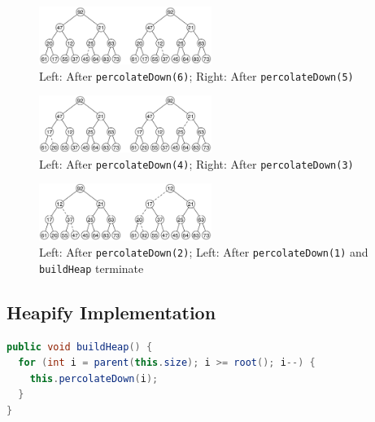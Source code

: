 \documentclass[
  10pt,
  english,
  letterpaper,
,tablecaptionabove
]{scrartcl}
\newcommand{\passthrough}[1]{#1}
\begin{document}
\begin{figure}
\centering
\includegraphics[width=0.5\textwidth,height=\textheight]{images/11.png}
\caption{Left: After \passthrough{\lstinline!percolateDown(6)!}; Right:
After \passthrough{\lstinline!percolateDown(5)!}}
\end{figure}

\begin{figure}
\centering
\includegraphics[width=0.5\textwidth,height=\textheight]{images/12.png}
\caption{Left: After \passthrough{\lstinline!percolateDown(4)!}; Right:
After \passthrough{\lstinline!percolateDown(3)!}}
\end{figure}

\begin{figure}
\centering
\includegraphics[width=0.5\textwidth,height=\textheight]{images/13.png}
\caption{Left: After \passthrough{\lstinline!percolateDown(2)!}; Left:
After \passthrough{\lstinline!percolateDown(1)!} and
\passthrough{\lstinline!buildHeap!} terminate}
\end{figure}

\hypertarget{heapify-implementation}{%
\subsection{Heapify Implementation}\label{heapify-implementation}}

\begin{lstlisting}[language=Java]
public void buildHeap() {
  for (int i = parent(this.size); i >= root(); i--) {
    this.percolateDown(i);
  }
}
\end{lstlisting}
\end{document}
